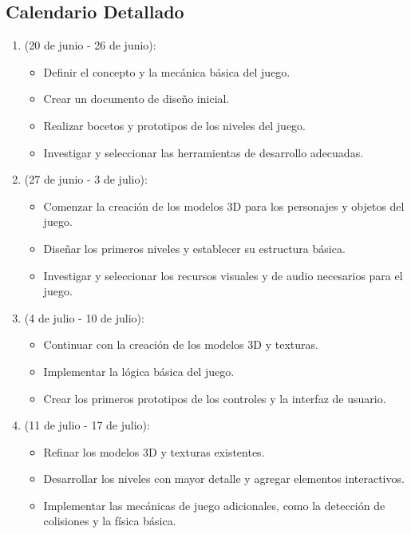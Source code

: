\subsection{Calendario Detallado}
\begin{enumerate}[label=Semana \arabic*:, align=left, leftmargin=*]
\item (20 de junio - 26 de junio):
\begin{itemize}[label=--]
	\item Definir el concepto y la mecánica básica del juego.
	\item Crear un documento de diseño inicial.
	\item Realizar bocetos y prototipos de los niveles del juego.
	\item Investigar y seleccionar las herramientas de desarrollo adecuadas.
\end{itemize}

\item (27 de junio - 3 de julio):
\begin{itemize}[label=--]
	\item Comenzar la creación de los modelos 3D para los personajes y objetos del juego.
	\item Diseñar los primeros niveles y establecer su estructura básica.
	\item Investigar y seleccionar los recursos visuales y de audio necesarios para el juego.
\end{itemize}

\item (4 de julio - 10 de julio):
\begin{itemize}[label=--]
	\item Continuar con la creación de los modelos 3D y texturas.
	\item Implementar la lógica básica del juego.
	\item Crear los primeros prototipos de los controles y la interfaz de usuario.
\end{itemize}

\item (11 de julio - 17 de julio):
\begin{itemize}[label=--]
	\item Refinar los modelos 3D y texturas existentes.
	\item Desarrollar los niveles con mayor detalle y agregar elementos interactivos.
	\item Implementar las mecánicas de juego adicionales, como la detección de colisiones y la física básica.
\end{itemize}


\end{enumerate}

